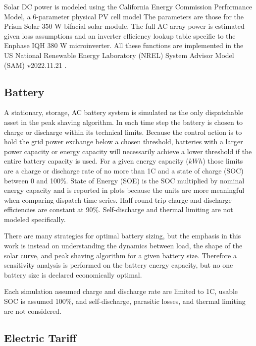 \documentclass[journal,article,submit,pdftex,moreauthors]{Definitions/mdpi}
\begin{document}
Solar DC power is modeled using the California Energy Commission Performance Model, a 6-parameter physical PV cell model The parameters are those for the Prism Solar 350 W bifacial solar module. The full AC array power is estimated given loss assumptions and an inverter efficiency lookup table specific to the Enphase IQH 380 W microinverter. All these functions are implemented in the US National Renewable Energy Laboratory (NREL) System Advisor Model (SAM) v2022.11.21 \cite{NREL2022}.

\subsection{Battery}\label{battery}%

A stationary, storage, AC battery system is simulated as the only dispatchable asset in the peak shaving algorithm. In each time step the battery is chosen to charge or discharge within its technical limits. Because the control action is to hold the grid power exchange below a chosen threshold, batteries with a larger power capacity or energy capacity will necessarily achieve a lower threshold if the entire battery capacity is used. For a given energy capacity (\(kWh\)) those limits are a charge or discharge rate of no more than 1C and a state of charge (SOC) between 0 and 100\%. State of Energy (SOE) is the SOC multiplied by nominal energy capacity and is reported in plots because the units are more meaningful when comparing dispatch time series. Half-round-trip charge and discharge efficiencies are constant at 90\%. Self-discharge and thermal limiting are not modeled specifically.

There are many strategies for optimal battery sizing, but the emphasis in this work is instead on understanding the dynamics between load, the shape of the solar curve, and peak shaving algorithm for a given battery size. Therefore a sensitivity analysis is performed on the battery energy capacity, but no one battery size is declared economically optimal.

Each simulation assumed charge and discharge rate are limited to 1C, usable SOC is assumed 100\%, and self-discharge, parasitic losses, and thermal limiting are not considered.

\subsection{Electric Tariff}\label{electric-tariff}
\end{document}
